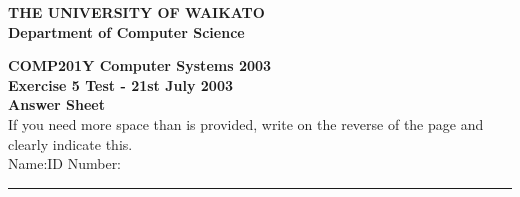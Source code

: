 \documentclass[a4paper,10pt]{article}
\begin{document}
\vspace*{-1cm} 

{\centering \large \bf THE UNIVERSITY OF WAIKATO\\}
{\centering \large \bf Department of Computer Science\\[0.5cm]}

{\centering \large \bf COMP201Y Computer Systems 2003\\}
{\centering \large \bf Exercise 5 Test - 21st July 2003\\[1cm]}
{\centering \large \bf Answer Sheet\\[5mm]}
If you need more space than is provided, write on the reverse of the
page and clearly indicate this.\\[5mm]
Name:\hspace*{5cm}ID Number:\\
\hrule
\end{document}
